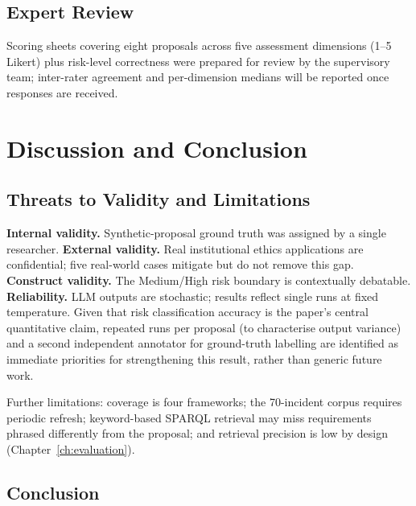 \documentclass[a4paper,oneside,12pt]{book}
\numberwithin{equation}{chapter}
\begin{document}
\section{Expert Review}

Scoring sheets covering eight proposals across five assessment dimensions (1--5 Likert) plus risk-level correctness were prepared for review by the supervisory team; inter-rater agreement and per-dimension medians will be reported once responses are received.

\chapter{Discussion and Conclusion}
\label{ch:conclusion}

\section{Threats to Validity and Limitations}

\textbf{Internal validity.} Synthetic-proposal ground truth was assigned by a single researcher. \textbf{External validity.} Real institutional ethics applications are confidential; five real-world cases mitigate but do not remove this gap. \textbf{Construct validity.} The Medium/High risk boundary is contextually debatable. \textbf{Reliability.} LLM outputs are stochastic; results reflect single runs at fixed temperature. Given that risk classification accuracy is the paper's central quantitative claim, repeated runs per proposal (to characterise output variance) and a second independent annotator for ground-truth labelling are identified as immediate priorities for strengthening this result, rather than generic future work.

Further limitations: coverage is four frameworks; the 70-incident corpus requires periodic refresh; keyword-based SPARQL retrieval may miss requirements phrased differently from the proposal; and retrieval precision is low by design (Chapter~\ref{ch:evaluation}).

\section{Conclusion}
\end{document}
